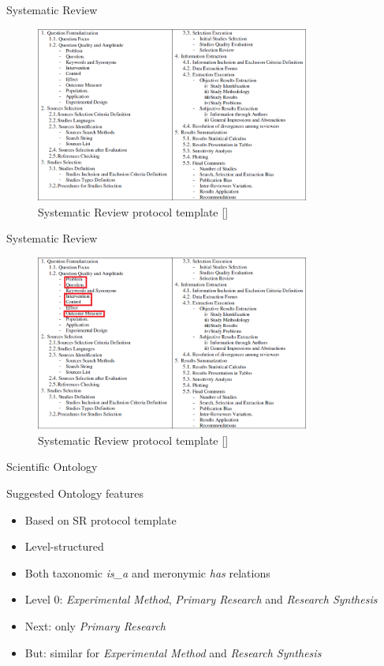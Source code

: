 \documentclass[16:9,en,navbarside]{sdqbeamer}
\begin{document}
\begin{frame}{Systematic Review}
    \begin{figure}
		\includegraphics[width=9cm]{images/SRreviewprotocol.PNG}
		\caption{Systematic Review protocol template [\cite{Bio07}]}
	\end{figure}
\end{frame}

\begin{frame}{Systematic Review}
    \begin{figure}
		\includegraphics[width=9cm]{images/SRreviewprotocol2.PNG}
		\caption{Systematic Review protocol template [\cite{Bio07}]}
	\end{figure}
\end{frame}

\begin{frame}{Scientific Ontology}
\begin{block}{Suggested Ontology features}
    \begin{itemize}
		\item<1-> Based on SR protocol template
		\item<2-> Level-structured
		\item<3-> Both taxonomic \textit{is\_a} and meronymic \textit{has} relations
		\item<4-> Level 0:  \textit{Experimental Method}, \textit{Primary Research} and \textit{Research Synthesis}
	    \item<5-> Next: only \textit{Primary Research}
	    \item<6-> But: similar for \textit{Experimental Method} and \textit{Research Synthesis}
	\end{itemize}
\end{block}
\end{frame}
\end{document}
